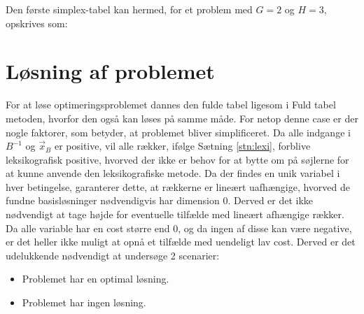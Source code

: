 Den første simplex-tabel kan hermed, for et problem med $G=2$ og $H=3$, opskrives som:\\



\section{Løsning af problemet}
For at løse optimeringsproblemet dannes den fulde tabel ligesom i Fuld tabel metoden, hvorfor den også kan løses på samme måde.
For netop denne case er der nogle faktorer, som betyder, at problemet bliver simplificeret.
Da alle indgange i $B^{-1}$ og $\vec{x}_B$ er positive, vil alle rækker, ifølge Sætning \ref{stn:lexi}, forblive leksikografisk positive, hvorved der ikke er behov for at bytte om på søjlerne for at kunne anvende den leksikografiske metode.
Da der findes en unik variabel i hver betingelse, garanterer dette, at rækkerne er lineært uafhængige, hvorved de fundne basisløsninger nødvendigvis har dimension $0$. Derved er det ikke nødvendigt at tage højde for eventuelle tilfælde med lineært afhængige rækker. Da alle variable har en cost større end $0$, og da ingen af disse kan være negative, er det heller ikke muligt at opnå et tilfælde med uendeligt lav cost. Derved er det udelukkende nødvendigt at undersøge 2 scenarier: 
\begin{itemize}
\item Problemet har en optimal løsning.
\item Problemet har ingen løsning.
\end{itemize}


